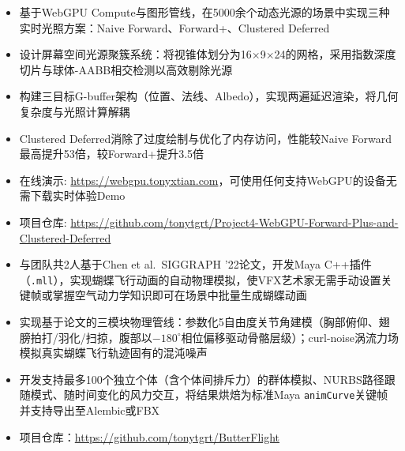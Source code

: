 \begin{itemize}
  \item 基于WebGPU Compute与图形管线，在5000余个动态光源的场景中实现三种实时光照方案：Naive Forward、Forward+、Clustered Deferred
  \item 设计屏幕空间光源聚簇系统：将视锥体划分为16×9×24的网格，采用指数深度切片与球体-AABB相交检测以高效剔除光源
  \item 构建三目标G-buffer架构（位置、法线、Albedo），实现两遍延迟渲染，将几何复杂度与光照计算解耦
  \item Clustered Deferred消除了过度绘制与优化了内存访问，性能较Naive Forward最高提升53倍，较Forward+提升3.5倍
  \item 在线演示: \url{https://webgpu.tonyxtian.com}，可使用任何支持WebGPU的设备无需下载实时体验Demo
  \item 项目仓库: \url{https://github.com/tonytgrt/Project4-WebGPU-Forward-Plus-and-Clustered-Deferred}
\end{itemize}

\begin{itemize}
  \item 与团队共2人基于Chen et al.\ SIGGRAPH '22论文，开发Maya C++插件（\texttt{.mll}），实现蝴蝶飞行动画的自动物理模拟，使VFX艺术家无需手动设置关键帧或掌握空气动力学知识即可在场景中批量生成蝴蝶动画
  \item 实现基于论文的三模块物理管线：参数化5自由度关节角建模（胸部俯仰、翅膀拍打/羽化/扫掠，腹部以$-180^\circ$相位偏移驱动骨骼层级）；curl-noise涡流力场模拟真实蝴蝶飞行轨迹固有的混沌噪声
  \item 开发支持最多100个独立个体（含个体间排斥力）的群体模拟、NURBS路径跟随模式、随时间变化的风力交互，将结果烘焙为标准Maya \texttt{animCurve}关键帧并支持导出至Alembic或FBX
  \item 项目仓库：\url{https://github.com/tonytgrt/ButterFlight}
\end{itemize}


